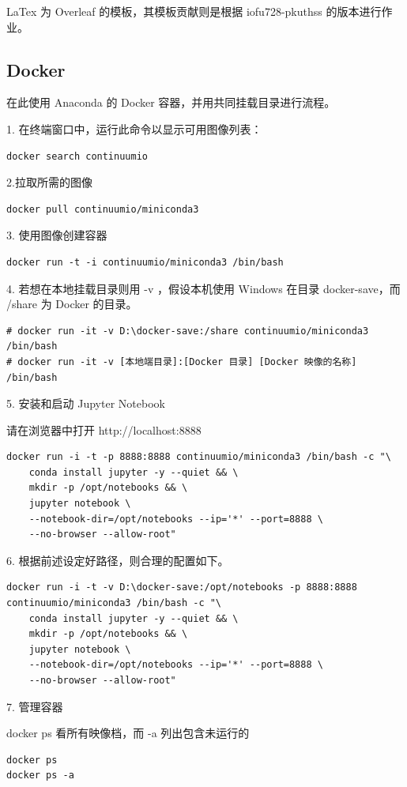 LaTex 为 Overleaf 的模板，其模板贡献则是根据 iofu728-pkuthss 的版本进行作业。

\subsection{Docker}

在此使用 Anaconda 的 Docker 容器，并用共同挂载目录进行流程。

1. 在终端窗口中，运行此命令以显示可用图像列表：

\begin{Verbatim}
docker search continuumio
\end{Verbatim}

2.拉取所需的图像

\begin{Verbatim}
docker pull continuumio/miniconda3
\end{Verbatim}

3. 使用图像创建容器

\begin{Verbatim}
docker run -t -i continuumio/miniconda3 /bin/bash
\end{Verbatim}

4. 若想在本地挂载目录则用 -v ，假设本机使用 Windows 在目录 docker-save，而 /share 为 Docker 的目录。

\begin{Verbatim}
# docker run -it -v D:\docker-save:/share continuumio/miniconda3 /bin/bash
# docker run -it -v [本地端目录]:[Docker 目录] [Docker 映像的名称] /bin/bash
\end{Verbatim}

5. 安装和启动 Jupyter Notebook

请在浏览器中打开 http://localhost:8888

\begin{Verbatim}
docker run -i -t -p 8888:8888 continuumio/miniconda3 /bin/bash -c "\
    conda install jupyter -y --quiet && \
    mkdir -p /opt/notebooks && \
    jupyter notebook \
    --notebook-dir=/opt/notebooks --ip='*' --port=8888 \
    --no-browser --allow-root"
\end{Verbatim}

6. 根据前述设定好路径，则合理的配置如下。

\begin{Verbatim}
docker run -i -t -v D:\docker-save:/opt/notebooks -p 8888:8888 continuumio/miniconda3 /bin/bash -c "\
    conda install jupyter -y --quiet && \
    mkdir -p /opt/notebooks && \
    jupyter notebook \
    --notebook-dir=/opt/notebooks --ip='*' --port=8888 \
    --no-browser --allow-root"
\end{Verbatim}

7. 管理容器

docker ps 看所有映像档，而 -a 列出包含未运行的

\begin{Verbatim}
docker ps
docker ps -a
\end{Verbatim}
